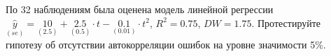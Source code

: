 \begin{problem}
По 32 наблюдениям была оценена модель линейной регрессии
$\underset{(se)}{\hat{y}}=\underset{(2.5)}{10}+\underset{(0.5)}{2.5}\cdot t- \underset{(0.01)}{0.1}\cdot t^2$, $R^2=0.75$, $DW=1.75$. Протестируйте гипотезу об отсутствии автокорреляции ошибок на уровне значимости 5\%.


\begin{sol}
\end{sol}
\end{problem}





